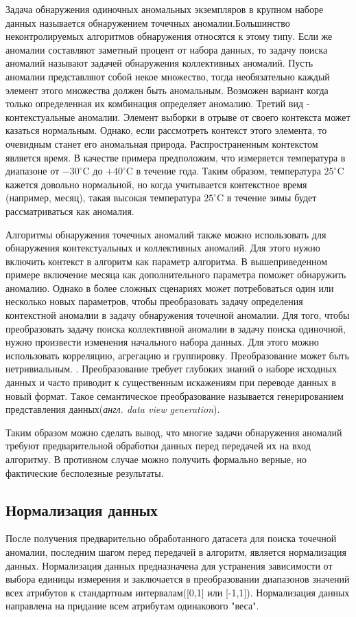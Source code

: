 Задача обнаружения одиночных аномальных экземпляров в крупном наборе данных называется обнаружением точечных аномалии\cite{Book04}.Большинство   неконтролируемых алгоритмов обнаружения  относятся к этому типу. Если же аномалии составляют заметный процент от набора данных, то задачу поиска аномалий называют задачей обнаружения коллективных аномалий. Пусть аномалии представляют собой некое множество, тогда необязательно каждый элемент этого множества должен быть аномальным. Возможен вариант когда только определенная их комбинация определяет аномалию.  Третий вид  -  контекстуальные аномалии. Элемент выборки в отрыве от своего контекста может казаться нормальным. Однако, если рассмотреть контекст этого элемента, то очевидным станет его аномальная природа.
 Распространенным контекстом является время. В качестве примера предположим, что  измеряется температура в диапазоне от $-30^{\circ}$C до $+40^{\circ}$C в течение года. Таким образом, температура $25^{\circ}$C кажется довольно нормальной, но когда  учитывается контекстное время (например, месяц), такая высокая температура $25^{\circ}$C  в течение зимы  будет рассматриваться как аномалия.

Алгоритмы обнаружения точечных аномалий также можно использовать для обнаружения контекстуальных и коллективных аномалий. Для этого нужно включить контекст в алгоритм как параметр алгоритма. В вышеприведенном примере включение месяца как дополнительного параметра поможет обнаружить аномалию. Однако в более сложных сценариях может потребоваться один или несколько новых параметров, чтобы преобразовать задачу определения контекстной аномалии в задачу обнаружения точечной аномалии.  Для того, чтобы преобразовать задачу поиска коллективной аномалии в задачу поиска одиночной, нужно произвести изменения начального набора данных. Для этого можно использовать корреляцию, агрегацию и группировку. Преобразование  может быть нетривиальным.\cite{Book05} . 
Преобразование требует глубоких знаний о наборе исходных данных и часто приводит  к существенным искажениям при переводе данных в новый формат. Такое семантическое преобразование называется  генерированием представления данных(\textit{англ. data view generation}).
  
  Таким образом можно сделать вывод, что многие задачи обнаружения аномалий требуют предварительной обработки данных перед передачей их на вход алгоритму. В противном случае можно получить формально верные, но фактические бесполезные результаты.
\subsection{Нормализация данных} 
После получения предварительно обработанного датасета для поиска точечной аномалии, последним шагом перед передачей в алгоритм, является нормализация данных. Нормализация данных предназначена для устранения зависимости от выбора единицы измерения и заключается в преобразовании диапазонов значений всех атрибутов к стандартным интервалам([0,1] или [-1,1])\cite{Book06}. Нормализация данных направлена на придание всем атрибутам одинакового "веса".
